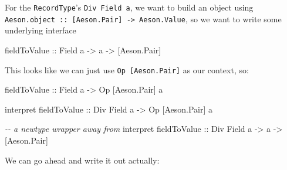 \documentclass[]{article}
\newenvironment{Shaded}{}{}
\newcommand{\CommentTok}[1]{\textcolor[rgb]{0.38,0.63,0.69}{\textit{#1}}}
\newcommand{\DataTypeTok}[1]{\textcolor[rgb]{0.56,0.13,0.00}{#1}}
\newcommand{\NormalTok}[1]{#1}
\newcommand{\OperatorTok}[1]{\textcolor[rgb]{0.40,0.40,0.40}{#1}}
\newcommand{\OtherTok}[1]{\textcolor[rgb]{0.00,0.44,0.13}{#1}}
\begin{document}
For the \texttt{RecordType}'s \texttt{Div\ Field\ a}, we want to build an object
using \texttt{Aeson.object\ ::\ {[}Aeson.Pair{]}\ -\textgreater{}\ Aeson.Value},
so we want to write some underlying interface

\begin{Shaded}
\begin{Highlighting}[]
\OtherTok{fieldToValue ::} \DataTypeTok{Field}\NormalTok{ a }\OtherTok{{-}>}\NormalTok{ a }\OtherTok{{-}>}\NormalTok{ [}\DataTypeTok{Aeson.Pair}\NormalTok{]}
\end{Highlighting}
\end{Shaded}

This looks like we can just use \texttt{Op\ {[}Aeson.Pair{]}} as our context,
so:

\begin{Shaded}
\begin{Highlighting}[]
\OtherTok{fieldToValue ::} \DataTypeTok{Field}\NormalTok{ a }\OtherTok{{-}>} \DataTypeTok{Op}\NormalTok{ [}\DataTypeTok{Aeson.Pair}\NormalTok{] a}

\NormalTok{interpret}\OtherTok{ fieldToValue ::} \DataTypeTok{Div} \DataTypeTok{Field}\NormalTok{ a }\OtherTok{{-}>} \DataTypeTok{Op}\NormalTok{ [}\DataTypeTok{Aeson.Pair}\NormalTok{] a}

\CommentTok{{-}{-} a newtype wrapper away from}
\NormalTok{interpret}\OtherTok{ fieldToValue ::} \DataTypeTok{Div} \DataTypeTok{Field}\NormalTok{ a }\OtherTok{{-}>}\NormalTok{ a }\OtherTok{{-}>}\NormalTok{ [}\DataTypeTok{Aeson.Pair}\NormalTok{]}
\end{Highlighting}
\end{Shaded}

We can go ahead and write it out actually:

\begin{Shaded}
\end{Shaded}
\end{document}
